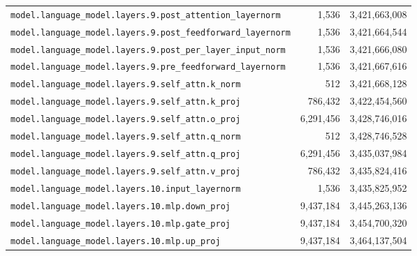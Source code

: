 \documentclass[10pt,a4paper]{article}
\theoremstyle{definition}
\begin{document}
\begin{appendices}
\begin{longtable}{p{9.5cm}rr}
\texttt{model.\allowbreak{}language\_model.\allowbreak{}layers.\allowbreak{}9.\allowbreak{}post\_attention\_layernorm} & 1,536 & 3,421,663,008 \\
\texttt{model.\allowbreak{}language\_model.\allowbreak{}layers.\allowbreak{}9.\allowbreak{}post\_feedforward\_layernorm} & 1,536 & 3,421,664,544 \\
\texttt{model.\allowbreak{}language\_model.\allowbreak{}layers.\allowbreak{}9.\allowbreak{}post\_per\_layer\_input\_norm} & 1,536 & 3,421,666,080 \\
\texttt{model.\allowbreak{}language\_model.\allowbreak{}layers.\allowbreak{}9.\allowbreak{}pre\_feedforward\_layernorm} & 1,536 & 3,421,667,616 \\
\texttt{model.\allowbreak{}language\_model.\allowbreak{}layers.\allowbreak{}9.\allowbreak{}self\_attn.\allowbreak{}k\_norm} & 512 & 3,421,668,128 \\
\texttt{model.\allowbreak{}language\_model.\allowbreak{}layers.\allowbreak{}9.\allowbreak{}self\_attn.\allowbreak{}k\_proj} & 786,432 & 3,422,454,560 \\
\texttt{model.\allowbreak{}language\_model.\allowbreak{}layers.\allowbreak{}9.\allowbreak{}self\_attn.\allowbreak{}o\_proj} & 6,291,456 & 3,428,746,016 \\
\texttt{model.\allowbreak{}language\_model.\allowbreak{}layers.\allowbreak{}9.\allowbreak{}self\_attn.\allowbreak{}q\_norm} & 512 & 3,428,746,528 \\
\texttt{model.\allowbreak{}language\_model.\allowbreak{}layers.\allowbreak{}9.\allowbreak{}self\_attn.\allowbreak{}q\_proj} & 6,291,456 & 3,435,037,984 \\
\texttt{model.\allowbreak{}language\_model.\allowbreak{}layers.\allowbreak{}9.\allowbreak{}self\_attn.\allowbreak{}v\_proj} & 786,432 & 3,435,824,416 \\
\texttt{model.\allowbreak{}language\_model.\allowbreak{}layers.\allowbreak{}10.\allowbreak{}input\_layernorm} & 1,536 & 3,435,825,952 \\
\texttt{model.\allowbreak{}language\_model.\allowbreak{}layers.\allowbreak{}10.\allowbreak{}mlp.\allowbreak{}down\_proj} & 9,437,184 & 3,445,263,136 \\
\texttt{model.\allowbreak{}language\_model.\allowbreak{}layers.\allowbreak{}10.\allowbreak{}mlp.\allowbreak{}gate\_proj} & 9,437,184 & 3,454,700,320 \\
\texttt{model.\allowbreak{}language\_model.\allowbreak{}layers.\allowbreak{}10.\allowbreak{}mlp.\allowbreak{}up\_proj} & 9,437,184 & 3,464,137,504 \\

\end{longtable}
\end{appendices}
\end{document}
